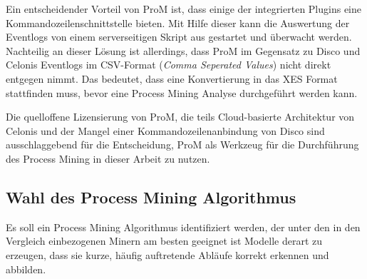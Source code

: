 \begin{table}[!h]
\centering
{}
\caption{Gegenüberstellung von technischen Eigenschaften der populärsten Process Mining Lösungen (Quelle: Erling C., Vergleich und Evaluation von Process Mining Software, 2019, S. 36,37,44,83 [\ref{comparison2}])}
\label{comparison2}
\end{table}

Ein entscheidender Vorteil von ProM ist, dass einige der integrierten Plugins eine Kommandozeilenschnittstelle bieten. Mit Hilfe dieser kann die Auswertung der Eventlogs von einem serverseitigen Skript aus gestartet und überwacht werden. Nachteilig an dieser Lösung ist allerdings, dass ProM im Gegensatz zu Disco und Celonis Eventlogs im CSV-Format (\textit{Comma Seperated Values}) nicht direkt entgegen nimmt. Das bedeutet, dass eine Konvertierung in das XES Format stattfinden muss, bevor eine Process Mining Analyse durchgeführt werden kann.

Die quelloffene Lizensierung von ProM, die teils Cloud-basierte Architektur von Celonis und der Mangel einer Kommandozeilenanbindung von Disco sind ausschlaggebend für die Entscheidung, ProM als Werkzeug für die Durchführung des Process Mining in dieser Arbeit zu nutzen. 

\subsection{Wahl des Process Mining Algorithmus}
Es soll ein Process Mining Algorithmus identifiziert werden, der unter den in den Vergleich einbezogenen Minern am besten geeignet ist Modelle derart zu erzeugen, dass sie kurze, häufig auftretende Abläufe korrekt erkennen und abbilden. 

